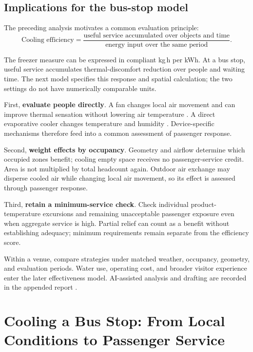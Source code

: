 \documentclass[12pt]{article}
\begin{document}
\subsection{Implications for the bus-stop model}

The preceding analysis motivates a common evaluation principle:
\begin{equation}
\boxed{\text{Cooling efficiency}
=\frac{\text{useful service accumulated over objects and time}}
{\text{energy input over the same period}}.}
\label{eq:principle}
\end{equation}

The freezer measure can be expressed in compliant kg\,h per kWh. At a bus stop, useful service accumulates thermal-discomfort reduction over people and waiting time. The next model specifies this response and spatial calculation; the two settings do not have numerically comparable units.

First, \textbf{evaluate people directly}. A fan changes local air movement and can improve thermal sensation without lowering air temperature \cite{energystar}. A direct evaporative cooler changes temperature and humidity \cite{evap}. Device-specific mechanisms therefore feed into a common assessment of passenger response.

Second, \textbf{weight effects by occupancy}. Geometry and airflow determine which occupied zones benefit; cooling empty space receives no passenger-service credit. Area is not multiplied by total headcount again. Outdoor air exchange may disperse cooled air while changing local air movement, so its effect is assessed through passenger response.

Third, \textbf{retain a minimum-service check}. Check individual product-temperature excursions and remaining unacceptable passenger exposure even when aggregate service is high. Partial relief can count as a benefit without establishing adequacy; minimum requirements remain separate from the efficiency score.

Within a venue, compare strategies under matched weather, occupancy, geometry, and evaluation periods. Water use, operating cost, and broader visitor experience enter the later effectiveness model. AI-assisted analysis and drafting are recorded in the appended report \cite{codex}.

\clearpage
\section{Cooling a Bus Stop: From Local Conditions to Passenger Service}
\label{sec:bus}
\end{document}
